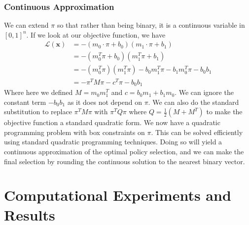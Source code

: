 \documentclass[11pt]{article}
\begin{document}
\subsubsection{Continuous Approximation}
We can extend $\pi$ so that rather than being binary, it is a continuous variable in $[0,1]^n$. If we look at our objective function, we have
\begin{align*}
    \mathcal{L}(\mathbf{x})&=-\left(m_0\cdot\pi+b_0\right)\left(m_1\cdot\pi+b_1\right) \\
    &=-\left(m_0^T\pi+b_0\right)\left(m_1^T\pi+b_1\right) \\
    &=-(m_0^T\pi) (m_1^T\pi) - b_0 m_1^T\pi - b_1 m_0^T\pi - b_0 b_1 \\
    &= -\pi^T M \pi - c^T\pi - b_0 b_1
\end{align*}
Where here we defined $M=m_0 m_1^T$ and $c=b_0m_1+b_1m_0$. We can ignore the constant term $-b_0 b_1$ as it does not depend on $\pi$. We can also do the standard substitution to replace $\pi^T M \pi$ with $\pi^T Q \pi$ where $Q=\frac{1}{2}\left(M+M^T\right)$ to make the objective function a standard quadratic form. We now have a quadratic programming problem with box constraints on $\pi$. This can be solved efficiently using standard quadratic programming techniques. Doing so will yield  a continuous approximation of the optimal policy selection, and we can make the final selection by rounding the continuous solution to the nearest binary vector.

\section{Computational Experiments and Results}




\end{document}

